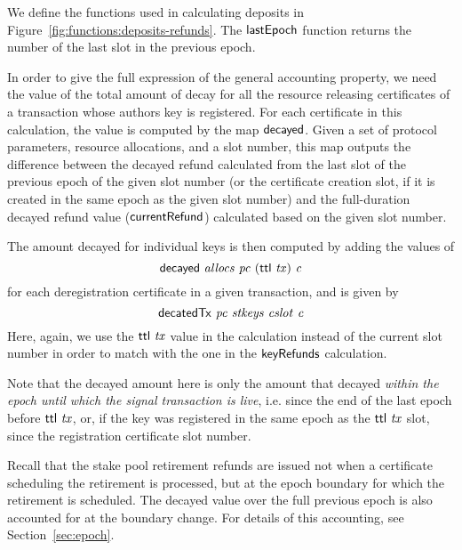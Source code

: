 \documentclass[11pt,a4paper,dvipsnames]{article}
\theoremstyle{definition}
\theoremstyle{definition}
\begin{document}
We define the functions used in calculating deposits in
Figure~\ref{fig:functions:deposits-refunds}.
The $\mathsf{lastEpoch}$ function
returns the number of the last slot in the previous epoch.

In order to give the full expression of the general accounting property,
we need the value of the total amount of decay for all the resource releasing
certificates of a transaction whose authors key is registered. For each
certificate in this calculation, the value is computed by the map $\mathsf{decayed}$.
Given a set of protocol parameters, resource allocations, and a slot
number, this map outputs the difference between the decayed refund calculated from
the last slot of the previous epoch of the given slot number
(or the certificate creation slot, if it is created in the same epoch as the
given slot number) and the
full-duration decayed refund value ($\mathsf{currentRefund}$) calculated based on
the given slot number.

The amount decayed for individual keys is then computed by adding the values of
$$\mathsf{decayed}~\mathit{allocs}~\mathit{pc}~(\mathsf{ttl}~\mathit{tx})~\mathit{c}$$
for each deregistration certificate in a given transaction, and is given by
$$\mathsf{decatedTx}~\mathit{pc}~\mathit{stkeys}~\mathit{cslot}~\mathit{c}$$
Here, again, we use the $\mathsf{ttl}~\mathit{tx}$ value in the calculation instead of the current
slot number in order to match with the one in the $\mathsf{keyRefunds}$
calculation.

Note that the decayed amount here is only the amount that decayed \textit{within
the epoch until which the signal transaction is live}, i.e. since the end of the
last epoch before $\mathsf{ttl}~\mathit{tx}$, or, if the key was
registered in the same epoch as the $\mathsf{ttl}~\mathit{tx}$ slot,
since the registration certificate slot number.

Recall that the stake pool retirement refunds are issued not when a certificate
scheduling the retirement is processed, but at the epoch boundary for which
the retirement is scheduled. The decayed value over the full previous epoch is
also accounted for at the boundary change. For details of this accounting, see
Section~\cref{sec:epoch}.
\end{document}
